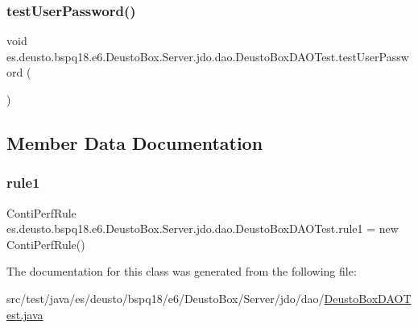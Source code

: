 \subsubsection{\texorpdfstring{test\+User\+Password()}{testUserPassword()}}
{\footnotesize\ttfamily void es.\+deusto.\+bspq18.\+e6.\+Deusto\+Box.\+Server.\+jdo.\+dao.\+Deusto\+Box\+D\+A\+O\+Test.\+test\+User\+Password (\begin{DoxyParamCaption}{ }\end{DoxyParamCaption})}



\subsection{Member Data Documentation}
\mbox{\label{classes_1_1deusto_1_1bspq18_1_1e6_1_1_deusto_box_1_1_server_1_1jdo_1_1dao_1_1_deusto_box_d_a_o_test_a10163f5377aa26e64e9d67a6389bc30c}} 
\subsubsection{\texorpdfstring{rule1}{rule1}}
{\footnotesize\ttfamily Conti\+Perf\+Rule es.\+deusto.\+bspq18.\+e6.\+Deusto\+Box.\+Server.\+jdo.\+dao.\+Deusto\+Box\+D\+A\+O\+Test.\+rule1 = new Conti\+Perf\+Rule()}



The documentation for this class was generated from the following file\+:\begin{DoxyCompactItemize}
\item 
src/test/java/es/deusto/bspq18/e6/\+Deusto\+Box/\+Server/jdo/dao/\mbox{\hyperlink{_deusto_box_d_a_o_test_8java}{Deusto\+Box\+D\+A\+O\+Test.\+java}}\end{DoxyCompactItemize}
